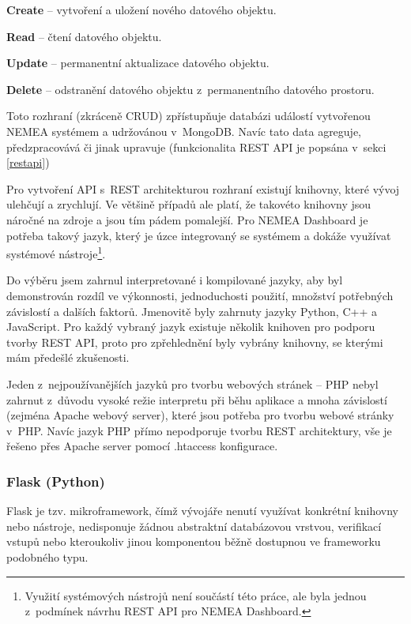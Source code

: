 \begin{description}
    \item {\bf Create} -- vytvoření a uložení nového datového objektu.
    \item {\bf Read} -- čtení datového objektu.
    \item {\bf Update} -- permanentní aktualizace datového objektu.
    \item {\bf Delete} -- odstranění datového objektu z~permanentního datového prostoru.
\end{description}

Toto rozhraní (zkráceně CRUD) zpřístupňuje databázi událostí vytvořenou NEMEA systémem a udržovánou v~MongoDB. Navíc tato data agreguje, předzpracovává či jinak upravuje (funkcionalita REST API je popsána v~sekci \ref{restapi})

Pro vytvoření API s~REST architekturou rozhraní existují knihovny, které vývoj ulehčují a zrychlují. Ve většině případů ale platí, že takovéto knihovny jsou náročné na zdroje a jsou tím pádem pomalejší. Pro NEMEA Dashboard je potřeba takový jazyk, který je úzce integrovaný se systémem a dokáže využívat systémové nástroje\footnote{Využití systémových nástrojů není součástí této práce, ale byla jednou z~podmínek návrhu REST API pro NEMEA Dashboard.}.

Do výběru jsem zahrnul interpretované i kompilované jazyky, aby byl demonstrován rozdíl ve výkonnosti, jednoduchosti použití, množství potřebných závislostí a dalších faktorů. Jmenovitě byly zahrnuty jazyky Python, C++ a JavaScript. Pro každý vybraný jazyk existuje několik knihoven pro podporu tvorby REST API, proto pro zpřehlednění byly vybrány knihovny, se kterými mám předešlé zkušenosti.

Jeden z~nejpoužívanějších jazyků pro tvorbu webových stránek -- PHP nebyl zahrnut z~důvodu vysoké režie interpretu při běhu aplikace a mnoha závislostí (zejména Apache webový server), které jsou potřeba pro tvorbu webové stránky v~PHP. Navíc jazyk PHP přímo nepodporuje tvorbu REST architektury, vše je řešeno přes Apache server pomocí .htaccess konfigurace.

\subsubsection*{Flask (Python)}

Flask je tzv. mikroframework, čímž vývojáře nenutí využívat konkrétní knihovny nebo nástroje, nedisponuje žádnou abstraktní databázovou vrstvou, verifikací vstupů nebo kteroukoliv jinou komponentou běžně dostupnou ve frameworku podobného typu.

